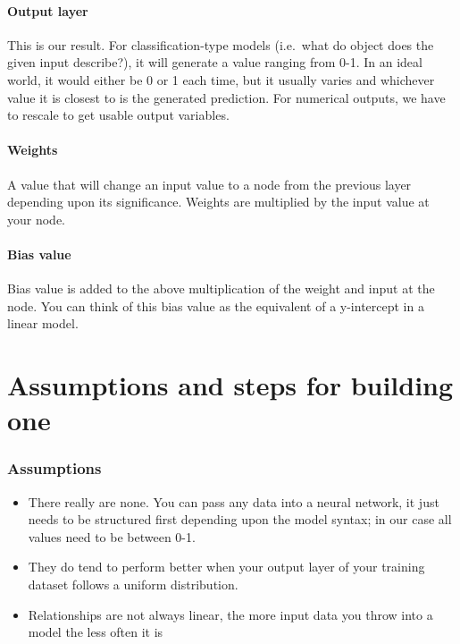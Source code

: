 \documentclass[
]{article}
\providecommand{\tightlist}{%
  \setlength{\itemsep}{0pt}\setlength{\parskip}{0pt}}
\begin{document}
\hypertarget{output-layer}{%
\paragraph{Output layer}\label{output-layer}}

This is our result. For classification-type models (i.e.~what do object
does the given input describe?), it will generate a value ranging from
0-1. In an ideal world, it would either be 0 or 1 each time, but it
usually varies and whichever value it is closest to is the generated
prediction. For numerical outputs, we have to rescale to get usable
output variables.

\hypertarget{weights}{%
\paragraph{Weights}\label{weights}}

A value that will change an input value to a node from the previous
layer depending upon its significance. Weights are multiplied by the
input value at your node.

\hypertarget{bias-value}{%
\paragraph{Bias value}\label{bias-value}}

Bias value is added to the above multiplication of the weight and input
at the node. You can think of this bias value as the equivalent of a
y-intercept in a linear model.

\hypertarget{assumptions-and-steps-for-building-one}{%
\section{Assumptions and steps for building
one}\label{assumptions-and-steps-for-building-one}}

\hypertarget{assumptions}{%
\subsubsection{Assumptions}\label{assumptions}}

\begin{itemize}
\tightlist
\item
  There really are none. You can pass any data into a neural network, it
  just needs to be structured first depending upon the model syntax; in
  our case all values need to be between 0-1.
\item
  They do tend to perform better when your output layer of your training
  dataset follows a uniform distribution.
\item
  Relationships are not always linear, the more input data you throw
  into a model the less often it is
\end{itemize}
\end{document}
